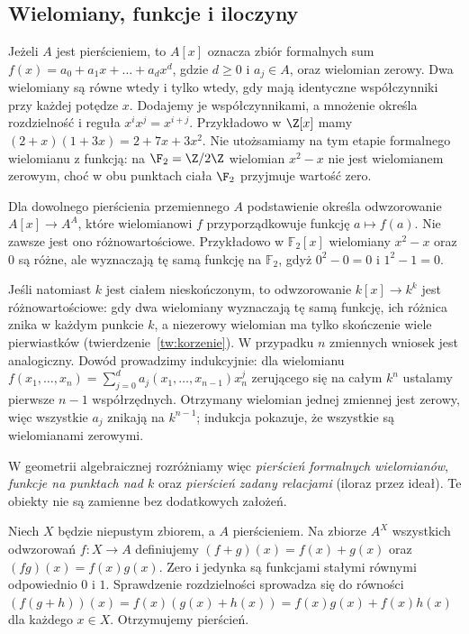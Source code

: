 \subsection{Wielomiany, funkcje i iloczyny}

\begin{przyklad}
Jeżeli $A$ jest pierścieniem, to $A[x]$ oznacza zbiór formalnych sum
$f(x)=a_0+a_1x+\dots+a_dx^d$, gdzie $d\ge0$ i $a_j\in A$, oraz wielomian
zerowy. Dwa wielomiany są równe wtedy i tylko wtedy, gdy mają identyczne
współczynniki przy każdej potędze $x$. Dodajemy je współczynnikami,
a mnożenie określa rozdzielność i reguła $x^ix^j=x^{i+j}$.
Przykładowo w $\Z[x]$ mamy
$(2+x)(1+3x)=2+7x+3x^2$.
Nie utożsamiamy na tym etapie formalnego wielomianu z funkcją:
na $\F_2=\Z/2\Z$ wielomian $x^2-x$ nie jest wielomianem zerowym,
choć w obu punktach ciała $\F_2$ przyjmuje wartość zero.
\end{przyklad}

\begin{uwaga}
\label{uw:formalna-funkcja}
Dla dowolnego pierścienia przemiennego $A$ podstawienie określa
odwzorowanie $A[x]\to A^A$, które wielomianowi $f$ przyporządkowuje
funkcję $a\mapsto f(a)$. Nie zawsze jest ono różnowartościowe.
Przykładowo w $\mathbb F_2[x]$ wielomiany $x^2-x$ oraz $0$ są różne,
ale wyznaczają tę samą funkcję na $\mathbb F_2$, gdyż
$0^2-0=0$ i $1^2-1=0$.

Jeśli natomiast $k$ jest ciałem nieskończonym, to odwzorowanie
$k[x]\to k^k$ jest różnowartościowe: gdy dwa wielomiany wyznaczają tę samą
funkcję, ich różnica znika w każdym punkcie $k$, a niezerowy wielomian
ma tylko skończenie wiele pierwiastków (twierdzenie~\ref{tw:korzenie}).
W przypadku $n$ zmiennych wniosek jest analogiczny. Dowód prowadzimy
indukcyjnie: dla wielomianu
$f(x_1,\dots,x_n)=\sum_{j=0}^d a_j(x_1,\dots,x_{n-1})x_n^j$
zerującego się na całym $k^n$ ustalamy pierwsze $n-1$ współrzędnych.
Otrzymany wielomian jednej zmiennej jest zerowy, więc wszystkie
$a_j$ znikają na $k^{n-1}$; indukcja pokazuje, że wszystkie są
wielomianami zerowymi.

W geometrii algebraicznej rozróżniamy więc 
\emph{pierścień formalnych wielomianów}, 
\emph{funkcje na punktach nad $k$} oraz 
\emph{pierścień zadany relacjami} (iloraz przez ideał).
Te obiekty nie są zamienne bez dodatkowych założeń.
\end{uwaga}

\begin{przyklad}
Niech $X$ będzie niepustym zbiorem, a $A$ pierścieniem.
Na zbiorze $A^X$ wszystkich odwzorowań $f\colon X\to A$ definiujemy
$(f+g)(x)=f(x)+g(x)$ oraz $(fg)(x)=f(x)g(x)$.
Zero i jedynka są funkcjami stałymi równymi odpowiednio $0$ i $1$.
Sprawdzenie rozdzielności sprowadza się do równości
$(f(g+h))(x)=f(x)(g(x)+h(x))=f(x)g(x)+f(x)h(x)$
dla każdego $x\in X$. Otrzymujemy pierścień.
\end{przyklad}

